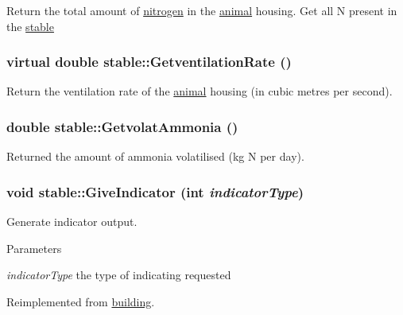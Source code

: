Return the total amount of \hyperlink{classnitrogen}{nitrogen} in the \hyperlink{classanimal}{animal} housing. Get all N present in the \hyperlink{classstable}{stable} \hypertarget{classstable_a2dc443b7a16b5f1ea82e8bd393724ee1}{
\subsubsection[{GetventilationRate}]{\setlength{\rightskip}{0pt plus 5cm}virtual double stable::GetventilationRate ()}}
\label{classstable_a2dc443b7a16b5f1ea82e8bd393724ee1}


Return the ventilation rate of the \hyperlink{classanimal}{animal} housing (in cubic metres per second). \hypertarget{classstable_a512896f7eb1325fc52e1c87e2ad128e3}{
\subsubsection[{GetvolatAmmonia}]{\setlength{\rightskip}{0pt plus 5cm}double stable::GetvolatAmmonia ()}}
\label{classstable_a512896f7eb1325fc52e1c87e2ad128e3}


Returned the amount of ammonia volatilised (kg N per day). \hypertarget{classstable_a2911ffc8041366d46674bf48a6b4d6c5}{
\subsubsection[{GiveIndicator}]{\setlength{\rightskip}{0pt plus 5cm}void stable::GiveIndicator (int {\em indicatorType})}}
\label{classstable_a2911ffc8041366d46674bf48a6b4d6c5}


Generate indicator output. 
\begin{DoxyParams}{Parameters}
\item[{\em indicatorType}]the type of indicating requested \end{DoxyParams}


Reimplemented from \hyperlink{classbuilding_ae0e21d6fc26978c65a980676ddf4fcdf}{building}.

